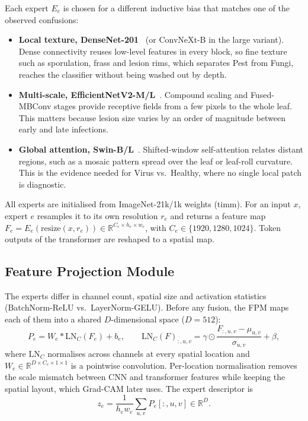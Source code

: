 Each expert $E_e$ is chosen for a different inductive bias that matches one of
the observed confusions:

\begin{itemize}
  \item \textbf{Local texture, DenseNet-201}~\cite{huang2017densenet} (or ConvNeXt-B in the large
  variant). Dense connectivity reuses low-level features in every block, so
  fine texture such as sporulation, frass and lesion rims, which separates Pest
  from Fungi, reaches the classifier without being washed out by depth.
  \item \textbf{Multi-scale, EfficientNetV2-M/L}~\cite{tan2021effnetv2}. Compound scaling and
  Fused-MBConv stages provide receptive fields from a few pixels to the whole
  leaf. This matters because lesion size varies by an order of magnitude between
  early and late infections.
  \item \textbf{Global attention, Swin-B/L}~\cite{liu2021swin}. Shifted-window self-attention
  relates distant regions, such as a mosaic pattern spread over the leaf or
  leaf-roll curvature. This is the evidence needed for Virus vs.\ Healthy, where
  no single local patch is diagnostic.
\end{itemize}

All experts are initialised from ImageNet-21k/1k weights (timm). For an input
$x$, expert $e$ resamples it to its own resolution $r_e$ and returns a feature map
$F_e = E_e(\mathrm{resize}(x, r_e)) \in \mathbb{R}^{C_e\times h_e\times w_e}$, with
$C_e\in\{1920, 1280, 1024\}$. Token outputs of the transformer are reshaped to a
spatial map.

\subsection{Feature Projection Module}
\label{sec:method_fpm}

The experts differ in channel count, spatial size and activation statistics
(BatchNorm-ReLU vs.\ LayerNorm-GELU). Before any fusion, the FPM maps each of them
into a shared $D$-dimensional space ($D=512$):
\begin{equation}
P_e = W_e * \mathrm{LN}_C(F_e) + b_e,\qquad
\mathrm{LN}_C(F)_{:,u,v} = \gamma \odot \frac{F_{:,u,v}-\mu_{u,v}}{\sigma_{u,v}} + \beta,
\end{equation}
where $\mathrm{LN}_C$ normalises across channels at every spatial location and
$W_e\in\mathbb{R}^{D\times C_e\times1\times1}$ is a pointwise convolution. Per-location
normalisation removes the scale mismatch between CNN and transformer features
while keeping the spatial layout, which Grad-CAM later uses. The expert descriptor
is
\begin{equation}
z_e = \frac{1}{h_e w_e}\sum_{u,v} P_e[:,u,v] \in \mathbb{R}^{D}.
\end{equation}

